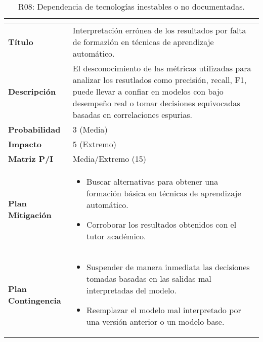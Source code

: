 \begin{table}[H]
\centering
\begin{tabular}{|>{\bfseries}l|p{10cm}|}
\hline
\rowcolor{lightgray}
\multicolumn{2}{|c|}{\textbf{Riesgo R08}} \\ \hline
Título & Interpretación errónea de los resultados por falta de formazión en técnicas de aprendizaje automático.  \\ \hline
Descripción & El desconocimiento de las métricas utilizadas para analizar los resutlados como precisión, recall, F1, puede llevar a confiar en modelos con bajo desempeño real o tomar decisiones equivocadas basadas en correlaciones espurias. \\ \hline
Probabilidad & 3 (Media) \cellcolor{yellowrisk} \\ \hline
Impacto & 5 (Extremo) \cellcolor{redrisk} \\ \hline
Matriz P/I & Media/Extremo (15) \\ \hline
Plan Mitigación & 
\begin{itemize}
\item Buscar alternativas para obtener una formación básica en técnicas de aprendizaje automático.
\item Corroborar los resultados obtenidos con el tutor académico.
\end{itemize} \\ \hline
Plan Contingencia & 
\begin{itemize}
\item Suspender de manera inmediata las decisiones tomadas basadas en las salidas mal interpretadas del modelo.
\item Reemplazar el modelo mal interpretado por una versión anterior o un modelo base.
\end{itemize} \\ \hline
\end{tabular}
\caption{R08: Dependencia de tecnologías inestables o no documentadas.}
\label{tab:R08}
\end{table}

